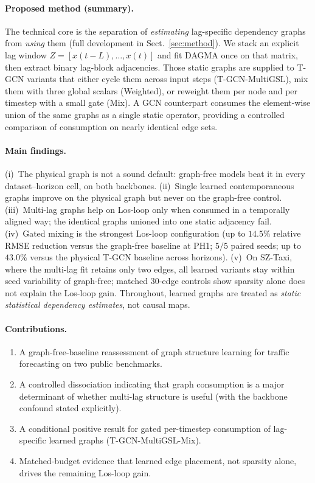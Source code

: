 \paragraph{Proposed method (summary).}
The technical core is the separation of \emph{estimating} lag-specific
dependency graphs from \emph{using} them (full development in
Sect.~\ref{sec:method}). We stack an explicit lag window
$Z=[x(t-L),\ldots,x(t)]$ and fit DAGMA once on that matrix, then extract
binary lag-block adjacencies. Those static graphs are supplied to T-GCN
variants that either cycle them across input steps (T-GCN-MultiGSL), mix
them with three global scalars (Weighted), or reweight them per node and
per timestep with a small gate (Mix). A GCN counterpart consumes the
element-wise union of the same graphs as a single static operator, providing
a controlled comparison of consumption on nearly identical edge sets.

\paragraph{Main findings.}
(i)~The physical graph is not a sound default: graph-free models beat it in
every dataset--horizon cell, on both backbones. (ii)~Single learned
contemporaneous graphs improve on the physical graph but never on the
graph-free control. (iii)~Multi-lag graphs help on Los-loop only when
consumed in a temporally aligned way; the identical graphs unioned into one
static adjacency fail. (iv)~Gated mixing is the strongest Los-loop
configuration (up to $14.5\%$ relative RMSE reduction versus the graph-free
baseline at PH1; $5/5$ paired seeds; up to $43.0\%$ versus the physical
T-GCN baseline across horizons). (v)~On SZ-Taxi, where the multi-lag fit
retains only two edges, all learned variants stay within seed variability of
graph-free; matched $30$-edge controls show sparsity alone does not explain
the Los-loop gain. Throughout, learned graphs are treated as \emph{static
statistical dependency estimates}, not causal maps.

\paragraph{Contributions.}
\begin{enumerate}
\item A graph-free-baseline reassessment of graph structure learning for
traffic forecasting on two public benchmarks.
\item A controlled dissociation indicating that graph consumption is a major
determinant of whether multi-lag structure is useful (with the backbone
confound stated explicitly).
\item A conditional positive result for gated per-timestep consumption of
lag-specific learned graphs (T-GCN-MultiGSL-Mix).
\item Matched-budget evidence that learned edge placement, not sparsity
alone, drives the remaining Los-loop gain.
\end{enumerate}

